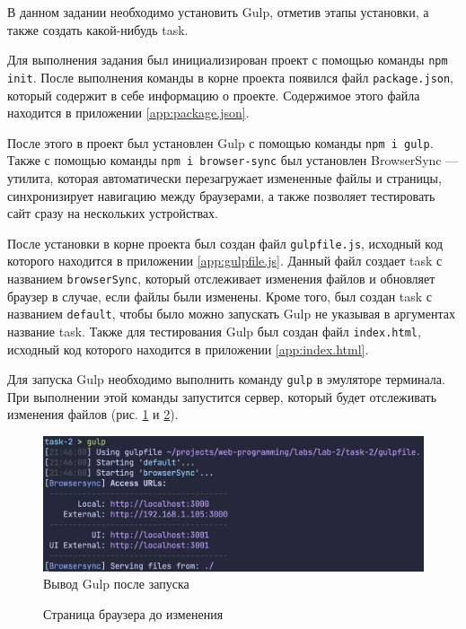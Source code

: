\documentclass[a4paper, 14pt]{extarticle}
\begin{document}
В данном задании необходимо установить Gulp, отметив этапы установки, а также
создать какой-нибудь task.

Для выполнения задания был инициализирован проект с помощью команды \texttt{npm
  init}. После выполнения команды в корне проекта появился файл
\texttt{package.json}, который содержит в себе информацию о проекте. Содержимое
этого файла находится в приложении \ref{app:package.json}.

После этого в проект был установлен Gulp с помощью команды \texttt{npm i gulp}.
Также с помощью команды \texttt{npm i browser-sync} был установлен BrowserSync —
утилита, которая автоматически перезагружает измененные файлы и страницы,
синхронизирует навигацию между браузерами, а также позволяет тестировать сайт
сразу на нескольких устройствах.

После установки в корне проекта был создан файл \texttt{gulpfile.js}, исходный
код которого находится в приложении \ref{app:gulpfile.js}. Данный файл создает
task с названием \texttt{browserSync}, который отслеживает изменения файлов и
обновляет браузер в случае, если файлы были изменены. Кроме того, был создан
task с названием \texttt{default}, чтобы было можно запускать Gulp не указывая в
аргументах название task. Также для тестирования Gulp был создан файл
\texttt{index.html}, исходный код которого находится в приложении
\ref{app:index.html}.

Для запуска Gulp необходимо выполнить команду \texttt{gulp} в эмуляторе
терминала. При выполнении этой команды запустится сервер, который будет
отслеживать изменения файлов (рис. \ref{fig:browser-sync} и
\ref{fig:browser-before}).

\begin{figure}[H]
  \centering
  \includegraphics[width=\textwidth]{images/browser-sync.png}
  \caption{Вывод Gulp после запуска}
  \label{fig:browser-sync}
\end{figure}

\begin{figure}[H]
  \centering
  \caption{Страница браузера до изменения}
  \label{fig:browser-before}
\end{figure}
\end{document}
